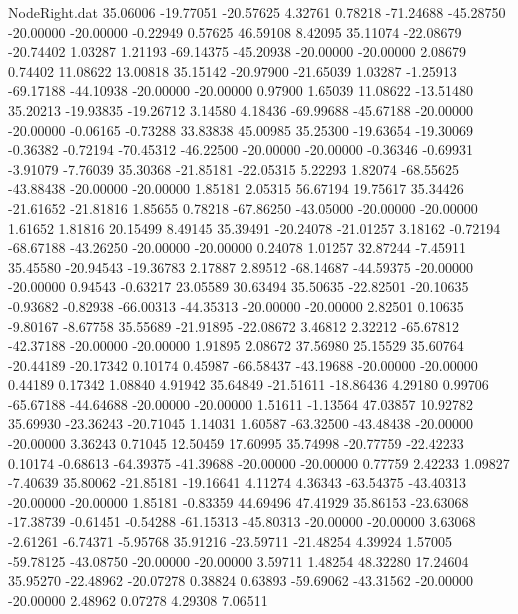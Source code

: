 \begin{filecontents}{NodeRight.dat}
  35.06006  -19.77051  -20.57625     4.32761    0.78218  -71.24688  -45.28750  -20.00000  -20.00000   -0.22949    0.57625   46.59108    8.42095
  35.11074  -22.08679  -20.74402     1.03287    1.21193  -69.14375  -45.20938  -20.00000  -20.00000    2.08679    0.74402   11.08622   13.00818
  35.15142  -20.97900  -21.65039     1.03287   -1.25913  -69.17188  -44.10938  -20.00000  -20.00000    0.97900    1.65039   11.08622  -13.51480
  35.20213  -19.93835  -19.26712     3.14580    4.18436  -69.99688  -45.67188  -20.00000  -20.00000   -0.06165   -0.73288   33.83838   45.00985
  35.25300  -19.63654  -19.30069    -0.36382   -0.72194  -70.45312  -46.22500  -20.00000  -20.00000   -0.36346   -0.69931   -3.91079   -7.76039
  35.30368  -21.85181  -22.05315     5.22293    1.82074  -68.55625  -43.88438  -20.00000  -20.00000    1.85181    2.05315   56.67194   19.75617
  35.34426  -21.61652  -21.81816     1.85655    0.78218  -67.86250  -43.05000  -20.00000  -20.00000    1.61652    1.81816   20.15499    8.49145
  35.39491  -20.24078  -21.01257     3.18162   -0.72194  -68.67188  -43.26250  -20.00000  -20.00000    0.24078    1.01257   32.87244   -7.45911
  35.45580  -20.94543  -19.36783     2.17887    2.89512  -68.14687  -44.59375  -20.00000  -20.00000    0.94543   -0.63217   23.05589   30.63494
  35.50635  -22.82501  -20.10635    -0.93682   -0.82938  -66.00313  -44.35313  -20.00000  -20.00000    2.82501    0.10635   -9.80167   -8.67758
  35.55689  -21.91895  -22.08672     3.46812    2.32212  -65.67812  -42.37188  -20.00000  -20.00000    1.91895    2.08672   37.56980   25.15529
  35.60764  -20.44189  -20.17342     0.10174    0.45987  -66.58437  -43.19688  -20.00000  -20.00000    0.44189    0.17342    1.08840    4.91942
  35.64849  -21.51611  -18.86436     4.29180    0.99706  -65.67188  -44.64688  -20.00000  -20.00000    1.51611   -1.13564   47.03857   10.92782
  35.69930  -23.36243  -20.71045     1.14031    1.60587  -63.32500  -43.48438  -20.00000  -20.00000    3.36243    0.71045   12.50459   17.60995
  35.74998  -20.77759  -22.42233     0.10174   -0.68613  -64.39375  -41.39688  -20.00000  -20.00000    0.77759    2.42233    1.09827   -7.40639
  35.80062  -21.85181  -19.16641     4.11274    4.36343  -63.54375  -43.40313  -20.00000  -20.00000    1.85181   -0.83359   44.69496   47.41929
  35.86153  -23.63068  -17.38739    -0.61451   -0.54288  -61.15313  -45.80313  -20.00000  -20.00000    3.63068   -2.61261   -6.74371   -5.95768
  35.91216  -23.59711  -21.48254     4.39924    1.57005  -59.78125  -43.08750  -20.00000  -20.00000    3.59711    1.48254   48.32280   17.24604
  35.95270  -22.48962  -20.07278     0.38824    0.63893  -59.69062  -43.31562  -20.00000  -20.00000    2.48962    0.07278    4.29308    7.06511

\end{filecontents}
